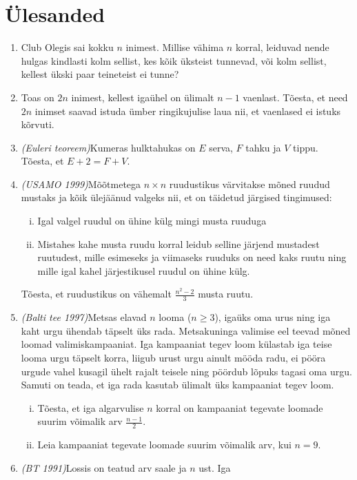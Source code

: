 \documentclass{article}
\begin{document}
\section{Ülesanded}
\begin{enumerate}
\item Club Olegis sai kokku $n$ inimest. Millise vähima $n$ korral,
  leiduvad nende hulgas kindlasti kolm sellist, kes kõik üksteist
  tunnevad, või kolm sellist, kellest ükski paar teineteist ei tunne?
\item Toas on $2n$ inimest, kellest igaühel on ülimalt $n - 1$
  vaenlast. Tõesta, et need $2n$ inimset saavad istuda ümber
  ringikujulise laua nii, et vaenlased ei istuks kõrvuti.
\item \emph{(Euleri teoreem)}\@ Kumeras hulktahukas on $E$ serva, $F$
  tahku ja $V$ tippu. Tõesta, et $E + 2 = F + V$.
\item \emph{(USAMO 1999)}\@ Mõõtmetega $n \times n$ ruudustikus
  värvitakse mõned ruudud mustaks ja kõik ülejäänud valgeks nii, et on
  täidetud järgised tingimused:
  \begin{enumerate}[(i)]
  \item Igal valgel ruudul on ühine külg mingi musta ruuduga
  \item Mistahes kahe musta ruudu korral leidub selline järjend
    mustadest ruutudest, mille esimeseks ja viimaseks ruuduks on need
    kaks ruutu ning mille igal kahel järjestikusel ruudul on ühine
    külg.
  \end{enumerate}
  Tõesta, et ruudustikus on vähemalt $\frac{n^2 - 2}{3}$ musta ruutu.
\item \emph{(Balti tee 1997)}\@ Metsas elavad $n$ looma ($n \geq 3$),
  igaüks oma urus ning iga kaht urgu ühendab täpselt üks
  rada. Metsakuninga valimise eel teevad mõned loomad
  valimiskampaaniat. Iga kampaaniat tegev loom külastab iga teise
  looma urgu täpselt korra, liigub urust urgu ainult mööda radu, ei
  pööra urgude vahel kusagil ühelt rajalt teisele ning pöördub lõpuks
  tagasi oma urgu. Samuti on teada, et iga rada kasutab ülimalt üks
  kampaaniat tegev loom.
  \begin{enumerate}[(i)]
  \item Tõesta, et iga algarvulise $n$ korral on kampaaniat tegevate
    loomade suurim võimalik arv $\frac{n - 1}{2}$.
  \item Leia kampaaniat tegevate loomade suurim võimalik arv, kui
    $n=9$.
  \end{enumerate}
\item \emph{(BT 1991)}\@ Lossis on teatud arv saale ja $n$ ust. Iga

\end{enumerate}
\end{document}
